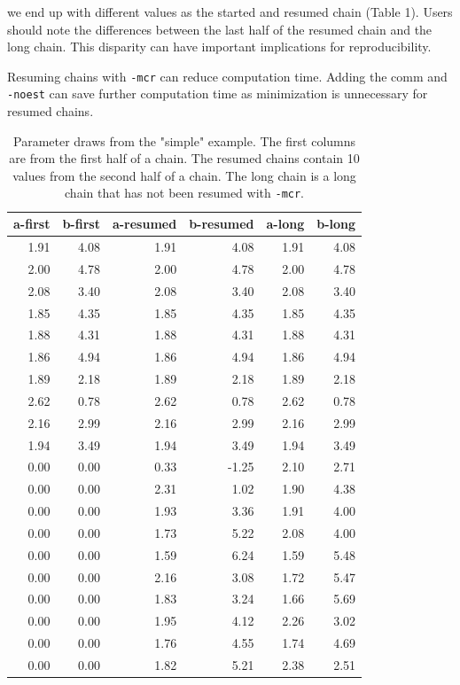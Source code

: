 \documentclass{article}\usepackage[]{graphicx}\usepackage[]{color}
\begin{document}
we end up with different values as the started and resumed chain (Table 1). 
Users should note the differences between the last half of the resumed chain 
and the long chain. This disparity can have important implications for
reproducibility.

Resuming chains with \texttt{-mcr} can reduce computation time. Adding the comm
and \texttt{-noest} can save further computation time as minimization is 
unnecessary for resumed chains.

\begin{table}[ht]
\centering
\begin{tabular}{rrrrrr}
  \hline
  a-first & b-first & a-resumed & b-resumed & a-long & b-long \\ 
  \hline
  1.91 & 4.08 & 1.91 & 4.08 & 1.91 & 4.08 \\ 
  2.00 & 4.78 & 2.00 & 4.78 & 2.00 & 4.78 \\ 
  2.08 & 3.40 & 2.08 & 3.40 & 2.08 & 3.40 \\ 
  1.85 & 4.35 & 1.85 & 4.35 & 1.85 & 4.35 \\ 
  1.88 & 4.31 & 1.88 & 4.31 & 1.88 & 4.31 \\ 
  1.86 & 4.94 & 1.86 & 4.94 & 1.86 & 4.94 \\ 
  1.89 & 2.18 & 1.89 & 2.18 & 1.89 & 2.18 \\ 
  2.62 & 0.78 & 2.62 & 0.78 & 2.62 & 0.78 \\ 
  2.16 & 2.99 & 2.16 & 2.99 & 2.16 & 2.99 \\ 
  1.94 & 3.49 & 1.94 & 3.49 & 1.94 & 3.49 \\ 
  0.00 & 0.00 & 0.33 & -1.25 & 2.10 & 2.71 \\ 
  0.00 & 0.00 & 2.31 & 1.02 & 1.90 & 4.38 \\ 
  0.00 & 0.00 & 1.93 & 3.36 & 1.91 & 4.00 \\ 
  0.00 & 0.00 & 1.73 & 5.22 & 2.08 & 4.00 \\ 
  0.00 & 0.00 & 1.59 & 6.24 & 1.59 & 5.48 \\ 
  0.00 & 0.00 & 2.16 & 3.08 & 1.72 & 5.47 \\ 
  0.00 & 0.00 & 1.83 & 3.24 & 1.66 & 5.69 \\ 
  0.00 & 0.00 & 1.95 & 4.12 & 2.26 & 3.02 \\ 
  0.00 & 0.00 & 1.76 & 4.55 & 1.74 & 4.69 \\ 
  0.00 & 0.00 & 1.82 & 5.21 & 2.38 & 2.51 \\ 
   \hline
\end{tabular}
\caption{Parameter draws from the "simple" example. The first columns are from the first half of a chain. The resumed chains contain 10 values from the second half of a chain. The long chain is a long chain that has not been resumed with \texttt{-mcr}.}
\label{tab:mcr_table}
\end{table}
\end{document}
